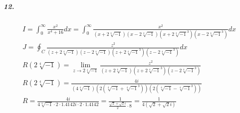 \documentclass[11pt, A4paper,norsk]{article}
\begin{document}
			\subparagraph{12.}
				\begin{gather*}
I = \int_{0}^{\infty} \frac{x^2}{x^4 + 16} dx = \int_{0}^{\infty} \frac{x^2}{(x + 2\sqrt[4]{-1})(x - 2\sqrt[4]{-1})(x + 2\sqrt[4]{-1}^3)(x - 2\sqrt[4]{-1}^3)} dx \\
J = \oint_{C} \frac{z^2}{(z + 2\sqrt[4]{-1})(z - 2\sqrt[4]{-1})(z + 2\sqrt[4]{-1}^3)(z - 2\sqrt[4]{-1}^3)} dx \\
R(2\sqrt[4]{-1}) = \lim_{z \rightarrow 2\sqrt[4]{-1}} \frac{z^2}{(z + 2\sqrt[4]{-1})(z + 2\sqrt[4]{-1}^3)(z - 2\sqrt[4]{-1}^3)} \\
R(2\sqrt[4]{-1}) = \frac{4i}{(4\sqrt[4]{-1})(2(\sqrt[4]{-1} + \sqrt[4]{-1}^3))(2(\sqrt[4]{-1} - \sqrt[4]{-1}^3))} \\
R = \frac{4i}{4\sqrt[4]{-1} \cdot 2 \cdot 1.4142i \cdot 2 \cdot 1.4142} = \frac{1}{\frac{\sqrt{2} + \sqrt{2}i}{2} \cdot 8} = \frac{1}{4(\sqrt{2} + \sqrt{2}i)}
				\end{gather*}
\end{document}
